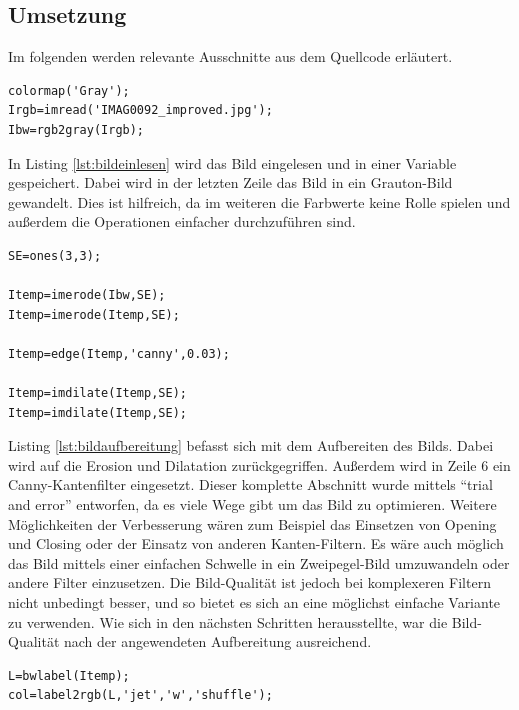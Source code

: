 \documentclass[a4paper,DIV=calc,ngerman]{scrartcl}
\begin{document}
\subsection{Umsetzung}
\label{sec:a1umsetzung}
Im folgenden werden relevante Ausschnitte aus dem Quellcode erläutert.

\begin{lstlisting}[frame=single, float, caption={Bild einlesen}, label={lst:bildeinlesen}]
colormap('Gray');
Irgb=imread('IMAG0092_improved.jpg');
Ibw=rgb2gray(Irgb);
\end{lstlisting}

In Listing \ref{lst:bildeinlesen} wird das Bild eingelesen und in einer Variable gespeichert. Dabei wird in der letzten Zeile das Bild in ein Grauton-Bild gewandelt. Dies ist hilfreich, da im weiteren die Farbwerte keine Rolle spielen und außerdem die Operationen einfacher durchzuführen sind.

\begin{lstlisting}[frame=single, float, caption={Bild-Aufbereitung}, label={lst:bildaufbereitung}]
SE=ones(3,3);

Itemp=imerode(Ibw,SE);
Itemp=imerode(Itemp,SE);

Itemp=edge(Itemp,'canny',0.03);

Itemp=imdilate(Itemp,SE);
Itemp=imdilate(Itemp,SE);
\end{lstlisting}

Listing \ref{lst:bildaufbereitung} befasst sich mit dem Aufbereiten des Bilds. Dabei wird auf die Erosion und Dilatation zurückgegriffen. Außerdem wird in Zeile 6 ein Canny-Kantenfilter eingesetzt. Dieser komplette Abschnitt wurde mittels "`trial and error"' entworfen, da es viele Wege gibt um das Bild zu optimieren. Weitere Möglichkeiten der Verbesserung wären zum Beispiel das Einsetzen von Opening und Closing oder der Einsatz von anderen Kanten-Filtern. Es wäre auch möglich das Bild mittels einer einfachen Schwelle in ein Zweipegel-Bild umzuwandeln oder andere Filter einzusetzen. Die Bild-Qualität ist jedoch bei komplexeren Filtern nicht unbedingt besser, und so bietet es sich an eine möglichst einfache Variante zu verwenden. Wie sich in den nächsten Schritten herausstellte, war die Bild-Qualität nach der angewendeten Aufbereitung ausreichend.


\begin{lstlisting}[frame=single, float, caption={Objekt-Segmentierung}, label={lst:segmentierung}]
L=bwlabel(Itemp);
col=label2rgb(L,'jet','w','shuffle');
\end{lstlisting}
\end{document}
